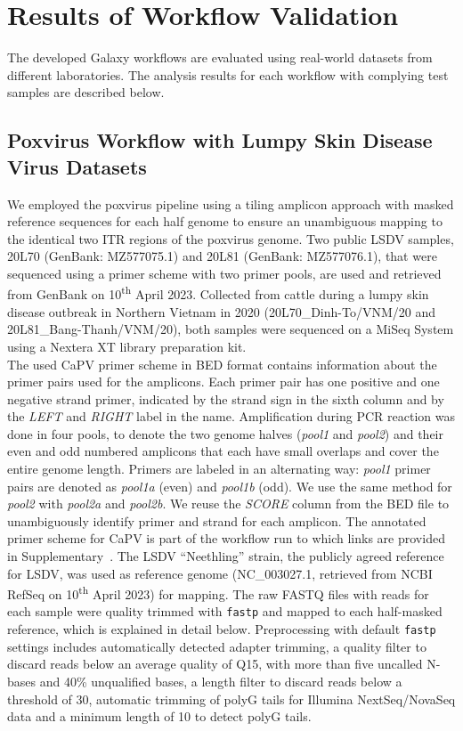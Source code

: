 \chapter{Results of Workflow Validation}\label{chap:results}
The developed Galaxy workflows are evaluated using real-world datasets from different laboratories. The analysis results for each workflow with complying test samples are described below.

\section{Poxvirus Workflow with Lumpy Skin Disease Virus Datasets}
We employed the poxvirus pipeline using a tiling amplicon approach with masked reference sequences for each half genome to ensure an unambiguous mapping to the identical two \ac{ITR} regions of the poxvirus genome. Two public \ac{LSDV} samples, 20L70 (GenBank: MZ577075.1) and 20L81 (GenBank: MZ577076.1), that were sequenced using a primer scheme with two primer pools, are used and retrieved from GenBank on 10\textsuperscript{th} April 2023. Collected from cattle during a lumpy skin disease outbreak in Northern Vietnam in 2020 (20L70\_Dinh-To/VNM/20 and 20L81\_Bang-Thanh/VNM/20), both samples were sequenced on a MiSeq System using a Nextera XT library preparation kit. \\
The used \acs{CaPV} primer scheme in \ac{BED} format contains information about the primer pairs used for the amplicons. Each primer pair has one positive and one negative strand primer, indicated by the strand sign in the sixth column and by the \textit{LEFT} and \textit{RIGHT} label in the name. Amplification during \ac{PCR} reaction was done in four pools, to denote the two genome halves (\textit{pool1} and \textit{pool2}) and their even and odd numbered amplicons that each have small overlaps and cover the entire genome length. Primers are labeled in an alternating way: \textit{pool1} primer pairs are denoted as \textit{pool1a} (even) and \textit{pool1b} (odd). We use the same method for \textit{pool2} with \textit{pool2a} and \textit{pool2b}. We reuse the \textit{SCORE} column from the \ac{BED} file to unambiguously identify primer and strand for each amplicon. The annotated primer scheme for \ac{CaPV} is part of the workflow run to which links are provided in Supplementary~. The \ac{LSDV} ``Neethling'' strain, the publicly agreed reference for \ac{LSDV}, was used as reference genome (NC\_003027.1, retrieved from \ac{NCBI} RefSeq on 10\textsuperscript{th} April 2023) for mapping. The raw FASTQ files with reads for each sample were quality trimmed with \texttt{fastp} and mapped to each half-masked reference, which is explained in detail below. Preprocessing with default \texttt{fastp} settings includes automatically detected adapter trimming, a quality filter to discard reads below an average quality of Q15, with more than five uncalled N-bases and 40\% unqualified bases, a length filter to discard reads below a threshold of 30, automatic trimming of polyG tails for Illumina NextSeq/NovaSeq data and a minimum length of 10 to detect polyG tails.
\\

